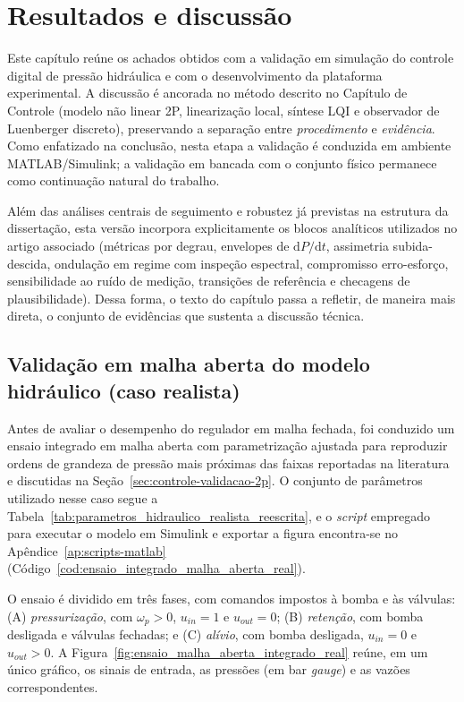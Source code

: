 \chapter{Resultados e discuss\~ao}
\label{chap:resultados}

Este capítulo reúne os achados obtidos com a validação em simulação do controle digital de pressão hidráulica e com o desenvolvimento da plataforma experimental. A discussão é ancorada no método descrito no Capítulo de Controle (modelo não linear 2P, linearização local, síntese LQI e observador de Luenberger discreto), preservando a separação entre \emph{procedimento} e \emph{evidência}. Como enfatizado na conclusão, nesta etapa a validação é conduzida em ambiente MATLAB/Simulink; a validação em bancada com o conjunto físico permanece como continuação natural do trabalho.

Além das análises centrais de seguimento e robustez já previstas na estrutura da dissertação, esta versão incorpora explicitamente os blocos analíticos utilizados no artigo associado (métricas por degrau, envelopes de $\mathrm{d}P/\mathrm{d}t$, assimetria subida-descida, ondulação em regime com inspeção espectral, compromisso erro-esforço, sensibilidade ao ruído de medição, transições de referência e checagens de plausibilidade). Dessa forma, o texto do capítulo passa a refletir, de maneira mais direta, o conjunto de evidências que sustenta a discussão técnica.

\section{Validação em malha aberta do modelo hidráulico (caso realista)}
\label{sec:resultados-malha-aberta-realista}
Antes de avaliar o desempenho do regulador em malha fechada, foi conduzido um ensaio integrado em malha aberta com parametrização ajustada para reproduzir ordens de grandeza de pressão mais próximas das faixas reportadas na literatura e discutidas na Seção~\ref{sec:controle-validacao-2p}. O conjunto de parâmetros utilizado nesse caso segue a Tabela~\ref{tab:parametros_hidraulico_realista_reescrita}, e o \textit{script} empregado para executar o modelo em Simulink e exportar a figura encontra-se no Apêndice~\ref{ap:scripts-matlab} (Código~\ref{cod:ensaio_integrado_malha_aberta_real}).

O ensaio é dividido em três fases, com comandos impostos à bomba e às válvulas: (A) \textit{pressurização}, com $\omega_p>0$, $u_{in}=1$ e $u_{out}=0$; (B) \textit{retenção}, com bomba desligada e válvulas fechadas; e (C) \textit{alívio}, com bomba desligada, $u_{in}=0$ e $u_{out}>0$. A Figura~\ref{fig:ensaio_malha_aberta_integrado_real} reúne, em um único gráfico, os sinais de entrada, as pressões (em bar \emph{gauge}) e as vazões correspondentes.

